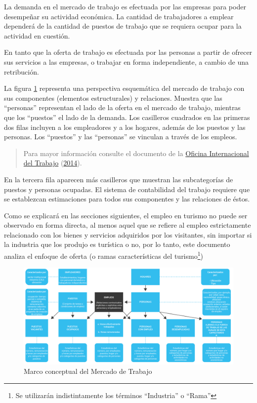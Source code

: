 \documentclass[
  openany]{book}
\begin{document}
La demanda en el mercado de trabajo es efectuada por las empresas para poder desempeñar su actividad económica. La cantidad de trabajadores a emplear dependerá de la cantidad de puestos de trabajo que se requiera ocupar para la actividad en cuestión.

En tanto que la oferta de trabajo es efectuada por las personas a partir de ofrecer sus servicios a las empresas, o trabajar en forma independiente, a cambio de una retribución.

La figura \ref{fig:empleooit} representa una perspectiva esquemática del mercado de trabajo con sus componentes (elementos estructurales) y relaciones. Muestra que las ``personas'' representan el lado de la oferta en el mercado de trabajo, mientras que los ``puestos'' el lado de la demanda. Los casilleros cuadrados en las primeras dos filas incluyen a los empleadores y a los hogares, además de los puestos y las personas. Los ``puestos'' y las ``personas'' se vinculan a través de los empleos.

\begin{quote}
Para mayor información consulte el documento de la \protect\hyperlink{ref-oitconferencia14}{Oficina Internacional del Trabajo} (\protect\hyperlink{ref-oitconferencia14}{2014}).
\end{quote}

En la tercera fila aparecen más casilleros que muestran las subcategorías de puestos y personas ocupadas. El sistema de contabilidad del trabajo requiere que se establezcan estimaciones para todos sus componentes y las relaciones de éstos.

Como se explicará en las secciones siguientes, el empleo en turismo no puede ser observado en forma directa, al menos aquel que se refiere al empleo estrictamente relacionado con los bienes y servicios adquiridos por los visitantes, sin importar si la industria que los produjo es turística o no, por lo tanto, este documento analiza el enfoque de oferta (o ramas características del turismo\footnote{Se utilizarán indistintamente los términos ``Industria'' o ``Rama''})

\begin{figure}

{\centering \includegraphics[width=1\linewidth]{imagenes/figura2.1} 

}

\caption{Marco conceptual del Mercado de Trabajo}\label{fig:empleooit}
\end{figure}
\end{document}
